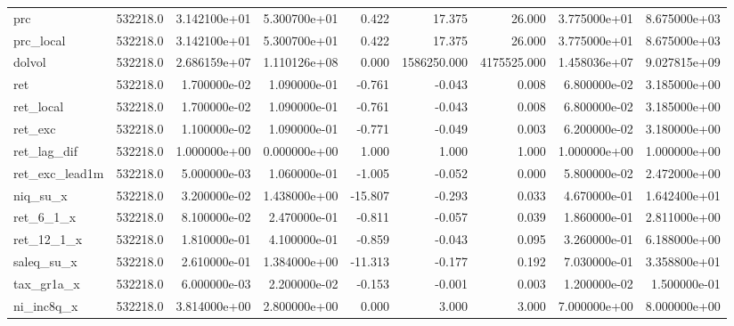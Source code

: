 \documentclass[12pt]{article}
\begin{document}
{\begin{landscape}
\begin{longtable}{|l|r|r|r|r|r|r|r|r|}
prc                    &  532218.0 &  3.142100e+01 &  5.300700e+01 &       0.422 &       17.375 &       26.000 &  3.775000e+01 &  8.675000e+03 \\
prc\_local              &  532218.0 &  3.142100e+01 &  5.300700e+01 &       0.422 &       17.375 &       26.000 &  3.775000e+01 &  8.675000e+03 \\
dolvol                 &  532218.0 &  2.686159e+07 &  1.110126e+08 &       0.000 &  1586250.000 &  4175525.000 &  1.458036e+07 &  9.027815e+09 \\
ret                    &  532218.0 &  1.700000e-02 &  1.090000e-01 &      -0.761 &       -0.043 &        0.008 &  6.800000e-02 &  3.185000e+00 \\
ret\_local              &  532218.0 &  1.700000e-02 &  1.090000e-01 &      -0.761 &       -0.043 &        0.008 &  6.800000e-02 &  3.185000e+00 \\
ret\_exc                &  532218.0 &  1.100000e-02 &  1.090000e-01 &      -0.771 &       -0.049 &        0.003 &  6.200000e-02 &  3.180000e+00 \\
ret\_lag\_dif            &  532218.0 &  1.000000e+00 &  0.000000e+00 &       1.000 &        1.000 &        1.000 &  1.000000e+00 &  1.000000e+00 \\
ret\_exc\_lead1m         &  532218.0 &  5.000000e-03 &  1.060000e-01 &      -1.005 &       -0.052 &        0.000 &  5.800000e-02 &  2.472000e+00 \\
niq\_su\_x               &  532218.0 &  3.200000e-02 &  1.438000e+00 &     -15.807 &       -0.293 &        0.033 &  4.670000e-01 &  1.642400e+01 \\
ret\_6\_1\_x              &  532218.0 &  8.100000e-02 &  2.470000e-01 &      -0.811 &       -0.057 &        0.039 &  1.860000e-01 &  2.811000e+00 \\
ret\_12\_1\_x             &  532218.0 &  1.810000e-01 &  4.100000e-01 &      -0.859 &       -0.043 &        0.095 &  3.260000e-01 &  6.188000e+00 \\
saleq\_su\_x             &  532218.0 &  2.610000e-01 &  1.384000e+00 &     -11.313 &       -0.177 &        0.192 &  7.030000e-01 &  3.358800e+01 \\
tax\_gr1a\_x             &  532218.0 &  6.000000e-03 &  2.200000e-02 &      -0.153 &       -0.001 &        0.003 &  1.200000e-02 &  1.500000e-01 \\
ni\_inc8q\_x             &  532218.0 &  3.814000e+00 &  2.800000e+00 &       0.000 &        3.000 &        3.000 &  7.000000e+00 &  8.000000e+00 \\

\end{longtable}
\end{landscape}}
\end{document}
